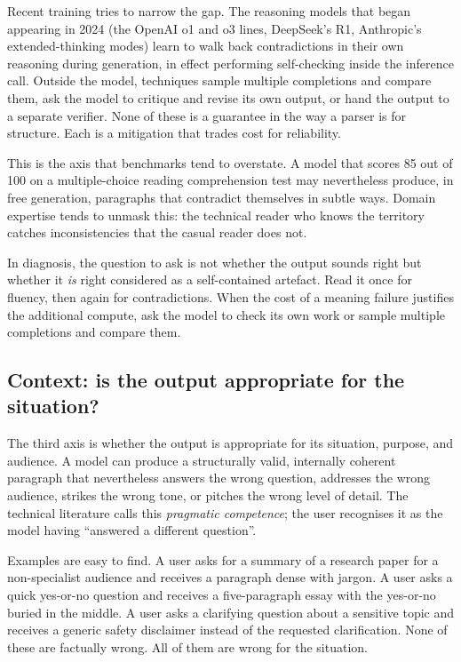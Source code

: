 Recent training tries to narrow the gap. The reasoning models
that began appearing in 2024 (the OpenAI o1 and o3 lines,
DeepSeek's R1, Anthropic's extended-thinking modes) learn to
walk back contradictions in their own reasoning during
generation, in effect performing self-checking inside the
inference call. Outside the model, techniques sample multiple
completions and compare them, ask the model to critique and
revise its own output, or hand the output to a separate
verifier. None of these is a guarantee in the way a parser is
for structure. Each is a mitigation that trades cost for
reliability.

This is the axis that benchmarks tend to overstate. A model
that scores 85 out of 100 on a multiple-choice reading
comprehension test may nevertheless produce, in free
generation, paragraphs that contradict themselves in subtle
ways. Domain expertise tends to unmask this: the technical
reader who knows the territory catches inconsistencies that
the casual reader does not.

In diagnosis, the question to ask is not whether the output
sounds right but whether it \emph{is} right considered as a
self-contained artefact. Read it once for fluency, then again
for contradictions. When the cost of a meaning failure
justifies the additional compute, ask the model to check its
own work or sample multiple completions and compare them.

\subsection*{Context: is the output appropriate for the
situation?}

The third axis is whether the output is appropriate for its
situation, purpose, and audience. A model can produce a
structurally valid, internally coherent paragraph that
nevertheless answers the wrong question, addresses the wrong
audience, strikes the wrong tone, or pitches the wrong level
of detail. The technical literature calls this
\emph{pragmatic competence}; the user recognises it as the
model having ``answered a different question''.

Examples are easy to find. A user asks for a summary of a
research paper for a non-specialist audience and receives a
paragraph dense with jargon. A user asks a quick yes-or-no
question and receives a five-paragraph essay with the
yes-or-no buried in the middle. A user asks a clarifying
question about a sensitive topic and receives a generic
safety disclaimer instead of the requested clarification.
None of these are factually wrong. All of them are wrong for
the situation.


